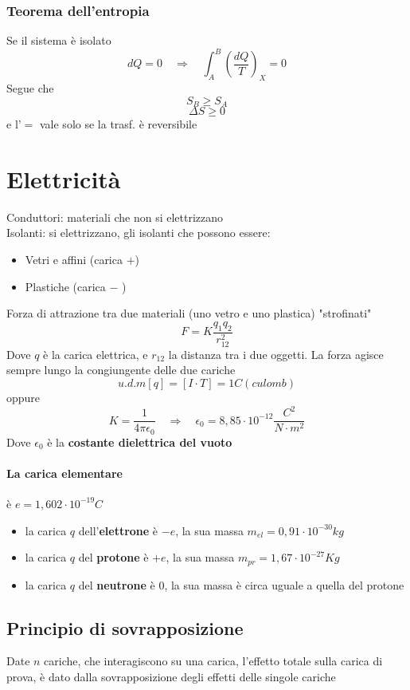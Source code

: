 \documentclass[a4paper]{report}
\begin{document}
  \subsection{Teorema dell'entropia}
  Se il sistema è isolato
  \[ dQ = 0 \quad \Rightarrow \quad \int_A^B(\frac{dQ}{T})_X = 0\]
  Segue che
  \[ S_B \geq S_A \]
  \[ \Delta S \geq 0 \]
  e l'$=$ vale solo se la trasf. è reversibile

  \chapter{Elettricità}
  Conduttori: materiali che non si elettrizzano \\
  Isolanti: si elettrizzano, gli isolanti che possono essere:
  \begin{itemize}
    \item Vetri e affini (carica $+$)
    \item Plastiche (carica $-$ )
  \end{itemize}
  Forza di attrazione tra due materiali (uno vetro e uno plastica) "strofinati"
  \[ F = K\frac{q_1 q_2}{r_{12}^2} \]
  Dove $q$ è la carica elettrica, e $r_{12}$ la distanza tra i due oggetti. La forza agisce sempre lungo la congiungente delle due cariche
  \[u.d.m[q] = [I\cdot T] = 1C (culomb)\]
  oppure
  \[ K = \frac{1}{4 \pi \epsilon_0} \quad \Rightarrow \quad \epsilon_0 = 8,85\cdot 10^{-12} \frac{C^2}{N\cdot m^2}\]
  Dove $\epsilon_0$ è la \textbf{costante dielettrica del vuoto}\\
  \subsubsection{La carica elementare}
  è $e = 1,602 \cdot 10^{-19} C$
  \begin{itemize}
    \item la carica $q$ dell'\textbf{elettrone} è $-e$, la sua massa $m_{el} = 0,91 \cdot 10^{-30} kg$
    \item la carica $q$ del \textbf{protone} è $+e$, la sua massa $m_{pr} = 1,67 \cdot 10^{-27} Kg$
    \item la carica $q$ del \textbf{neutrone} è $0$, la sua massa è circa uguale a quella del protone
  \end{itemize}

  \section{Principio di sovrapposizione}
  Date $n$ cariche, che interagiscono su una carica, l'effetto totale sulla carica di prova, è dato dalla sovrapposizione degli effetti delle singole cariche
\end{document}

